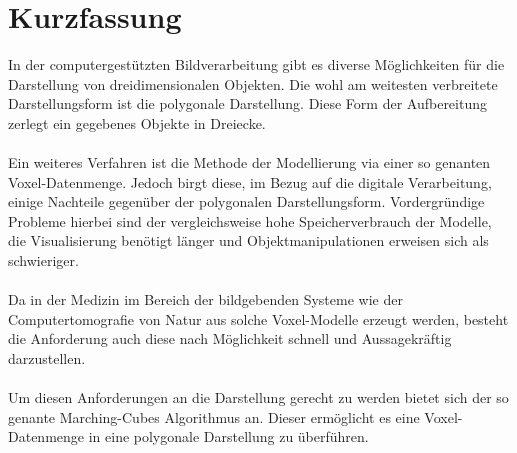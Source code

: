 
\chapter{Kurzfassung}

In der computergestützten Bildverarbeitung gibt es diverse Möglichkeiten für die Darstellung von dreidimensionalen Objekten. Die wohl am weitesten verbreitete Darstellungsform ist die polygonale Darstellung. Diese Form der Aufbereitung zerlegt ein gegebenes Objekte in Dreiecke. 
\\\\
Ein weiteres Verfahren ist die Methode der Modellierung via einer so genanten Voxel-Datenmenge. Jedoch birgt diese, im Bezug auf die digitale Verarbeitung, einige Nachteile gegenüber der polygonalen Darstellungsform. Vordergründige Probleme hierbei sind der vergleichsweise hohe Speicherverbrauch der Modelle, die Visualisierung benötigt länger und Objektmanipulationen erweisen sich als schwieriger.
\\\\
Da in der Medizin im Bereich der bildgebenden Systeme wie der Computertomografie von Natur aus solche Voxel-Modelle erzeugt werden, besteht die Anforderung auch diese nach Möglichkeit schnell und Aussagekräftig darzustellen.
\\\\
Um diesen Anforderungen an die Darstellung gerecht zu werden bietet sich der so genante Marching-Cubes Algorithmus an. Dieser ermöglicht es eine Voxel-Datenmenge in eine polygonale Darstellung zu überführen. 
